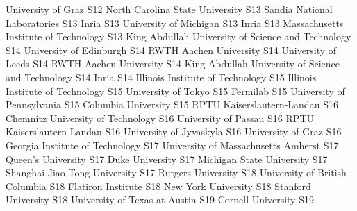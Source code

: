\begin{multicols}{2}
{}
{University of Graz}
{S12}
{}
{North Carolina State University}
{S13}
{}
{Sandia National Laboratories}
{S13}
{}
{Inria}
{S13}
{}
{University of Michigan}
{S13}
{}
{Inria}
{S13}
{}
{Massachusetts Institute of Technology}
{S13}
{}
{King Abdullah University of Science and Technology}
{S14}
{}
{University of Edinburgh}
{S14}
{}
{RWTH Aachen University}
{S14}
{}
{University of Leeds}
{S14}
{}
{RWTH Aachen University}
{S14}
{}
{King Abdullah University of Science and Technology}
{S14}
{}
{Inria}
{S14}
{}
{Illinois Institute of Technology}
{S15}
{}
{Illinois Institute of Technology}
{S15}
{}
{University of Tokyo}
{S15}
{}
{Fermilab}
{S15}
{}
{University of Pennsylvania}
{S15}
{}
{Columbia University}
{S15}
{}
{RPTU Kaiserslautern-Landau}
{S16}
{}
{Chemnitz University of Technology}
{S16}
{}
{University of Passau}
{S16}
{}
{RPTU Kaiserslautern-Landau}
{S16}
{}
{University of Jyvaskyla}
{S16}
{}
{University of Graz}
{S16}
{}
{Georgia Institute of Technology}
{S17}
{}
{University of Massachusetts Amherst}
{S17}
{}
{Queen's University}
{S17}
{}
{Duke University}
{S17}
{}
{Michigan State University}
{S17}
{}
{Shanghai Jiao Tong University}
{S17}
{}
{Rutgers University}
{S18}
{}
{University of British Columbia}
{S18}
{}
{Flatiron Institute}
{S18}
{}
{New York University}
{S18}
{}
{Stanford University}
{S18}
{}
{University of Texas at Austin}
{S19}
{}
{Cornell University}
{S19}

\end{multicols}
